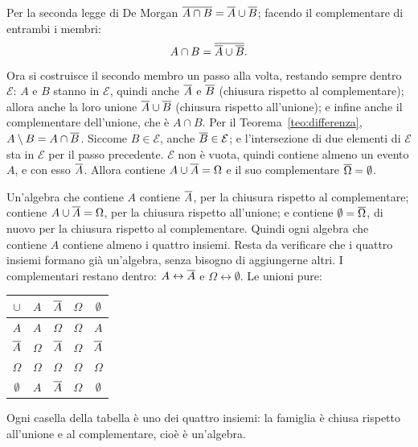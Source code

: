 \begin{dimostrazione}
 Per la seconda legge di De Morgan $\overline{A \cap B} = \overline{A} \cup \overline{B}$;
facendo il complementare di entrambi i membri:
\[ A \cap B = \overline{\overline{A} \cup \overline{B}} . \]
Ora si costruisce il secondo membro un passo alla volta, restando sempre dentro $\mathcal{E}$: $A$ e $B$ stanno in
$\mathcal{E}$, quindi anche $\overline{A}$ e $\overline{B}$ (chiusura rispetto al complementare); allora anche la loro
unione $\overline{A} \cup \overline{B}$ (chiusura rispetto all'unione); e infine anche il complementare dell'unione, che è
$A \cap B$.
 Per il Teorema~\ref{teo:differenza}, $A \setminus B = A \cap \overline{B}$. Siccome $B \in
\mathcal{E}$, anche $\overline{B} \in \mathcal{E}$; e l'intersezione di due elementi di $\mathcal{E}$ sta in
$\mathcal{E}$ per il passo precedente.
 $\mathcal{E}$ non è vuota, quindi contiene almeno un evento $A$, e con esso
$\overline{A}$. Allora contiene $A \cup \overline{A} = \Omega$ e il suo complementare $\overline{\Omega} = \emptyset$.
\end{dimostrazione}


\begin{dimostrazione}
 Un'algebra che contiene $A$ contiene $\overline{A}$, per la chiusura rispetto
al complementare; contiene $A \cup \overline{A} = \Omega$, per la chiusura rispetto all'unione; e contiene
$\emptyset = \overline{\Omega}$, di nuovo per la chiusura rispetto al complementare. Quindi ogni algebra che contiene $A$
contiene almeno i quattro insiemi.
 Resta da verificare che i quattro insiemi formano già un'algebra, senza bisogno di aggiungerne
altri. I complementari restano dentro: $A \leftrightarrow \overline{A}$ e $\Omega \leftrightarrow \emptyset$. Le unioni
pure:
\begin{center}
\renewcommand{\arraystretch}{1.25}
\begin{tabular}{c|cccc}
  $\cup$ & $A$ & $\overline{A}$ & $\Omega$ & $\emptyset$ \\ \hline
  $A$ & $A$ & $\Omega$ & $\Omega$ & $A$ \\
  $\overline{A}$ & $\Omega$ & $\overline{A}$ & $\Omega$ & $\overline{A}$ \\
  $\Omega$ & $\Omega$ & $\Omega$ & $\Omega$ & $\Omega$ \\
  $\emptyset$ & $A$ & $\overline{A}$ & $\Omega$ & $\emptyset$
\end{tabular}
\end{center}
Ogni casella della tabella è uno dei quattro insiemi: la famiglia è chiusa rispetto all'unione e al complementare,
cioè è un'algebra.
\end{dimostrazione}

